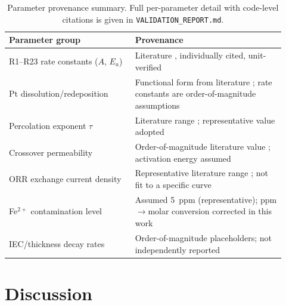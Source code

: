\documentclass[10pt,twocolumn]{article}
\begin{document}
\begin{table}[t]
\centering
\caption{Parameter provenance summary. Full per-parameter detail with
code-level citations is given in \texttt{VALIDATION\_REPORT.md}.}
\label{tab:params}
\small
\begin{tabular}{@{}p{0.42\linewidth}p{0.5\linewidth}@{}}
\toprule
\textbf{Parameter group} & \textbf{Provenance} \\
\midrule
R1--R23 rate constants ($A$, $E_a$) & Literature \citep{fruhwirt2020}, individually cited, unit-verified \\
Pt dissolution/redeposition & Functional form from literature \citep{darling2003,rinaldo2011}; rate constants are order-of-magnitude assumptions \\
Percolation exponent $\tau$ & Literature range \citep{stauffer1994}; representative value adopted \\
Crossover permeability & Order-of-magnitude literature value \citep{kreuer2004}; activation energy assumed \\
ORR exchange current density & Representative literature range \citep{neyerlin2006}; not fit to a specific curve \\
Fe$^{2+}$ contamination level & Assumed 5~ppm (representative); ppm$\to$molar conversion corrected in this work \\
IEC/thickness decay rates & Order-of-magnitude placeholders; not independently reported \\
\bottomrule
\end{tabular}
\end{table}

\section{Discussion}
\end{document}
